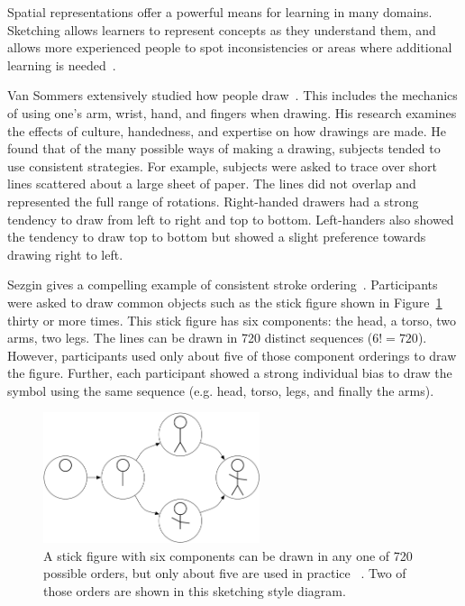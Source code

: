 Spatial representations offer a powerful means for learning in many
domains. Sketching allows learners to represent concepts as they
understand them, and allows more experienced people to spot
inconsistencies or areas where additional learning is
needed~\cite{forbus-cogsketch-tutorial}.

Van Sommers extensively studied how people
draw~\cite{van-sommers-cognition}. This includes the mechanics of
using one's arm, wrist, hand, and fingers when drawing. His research
examines the effects of culture, handedness, and expertise on how
drawings are made. He found that of the many possible ways of making a
drawing, subjects tended to use consistent strategies. For example,
subjects were asked to trace over short lines scattered about a large
sheet of paper. The lines did not overlap and represented the full
range of rotations. Right-handed drawers had a strong tendency to draw
from left to right and top to bottom. Left-handers also showed the
tendency to draw top to bottom but showed a slight preference towards
drawing right to left.

Sezgin gives a compelling example of consistent stroke
ordering~\cite{sezgin-phd-thesis}. Participants were asked to draw
common objects such as the stick figure shown in
Figure~\ref{fig:stick-figure} thirty or more times. This stick figure
has six components: the head, a torso, two arms, two legs. The lines
can be drawn in 720 distinct sequences \nohyphens{($6!=720$)}.
However, participants used only about five of those component
orderings to draw the figure. Further, each participant showed a
strong individual bias to draw the symbol using the same sequence
(e.g. head, torso, legs, and finally the arms).

\begin{figure}
\begin{center}
  \includegraphics[width=2.5in]{img/sezgin-sketching-style-diagram.pdf} 

  \caption{A stick figure with six components can be drawn in any one
  of 720 possible orders, but only about five are used in
  practice \protect~\cite{sezgin-phd-thesis}. Two of those orders are
  shown in this sketching style diagram.}

\label{fig:stick-figure}
\end{center}
\end{figure}

